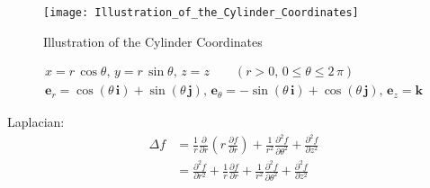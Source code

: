 \documentclass[../main.tex]{subfiles}
\begin{document}
\begin{SCfigure}[0.6][h]
    \texttt{[image: Illustration\_of\_the\_Cylinder\_Coordinates]}
    \caption{Illustration of the Cylinder Coordinates}
    \label{fig:ECBI1}
\end{SCfigure}

\FloatBarrier

\begin{align*}
    x = r \, \cos{\theta} \text{, } y = r \, \sin{\theta} \text{, } z = z \qquad (r > 0 \text{, } 0 \leqslant \theta \leqslant 2 \, \pi) \\
    \mathbf{e}_r = \cos{(\theta \, \mathbf{i})} + \sin{(\theta \, \mathbf{j})} \text{, } \mathbf{e}_{\theta} = - \sin{(\theta \, \mathbf{i})} + \cos{(\theta \, \mathbf{j})} \text{, } \mathbf{e}_z = \mathbf{k}
\end{align*}

Laplacian:
\begin{equation*}
    \begin{split}
        \Delta f &= \frac{1}{r} \frac{\partial}{\partial r} \left(r \, \frac{\partial f}{\partial r} \right) + \frac{1}{r^2} \frac{\partial^2 f}{\partial \theta^2} + \frac{\partial^2 f}{\partial z^2} \\
        &= \frac{\partial^2 f}{\partial r^2} + \frac{1}{r} \frac{\partial f}{\partial r} + \frac{1}{r^2} \frac{\partial^2 f}{\partial \theta^2} + \frac{\partial^2 f}{\partial z^2}
    \end{split}
\end{equation*}
\end{document}
